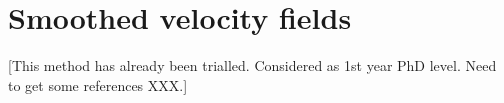 \section{Smoothed velocity fields}
[This method has already been trialled. Considered as 1st year PhD level. Need to get some references XXX.]